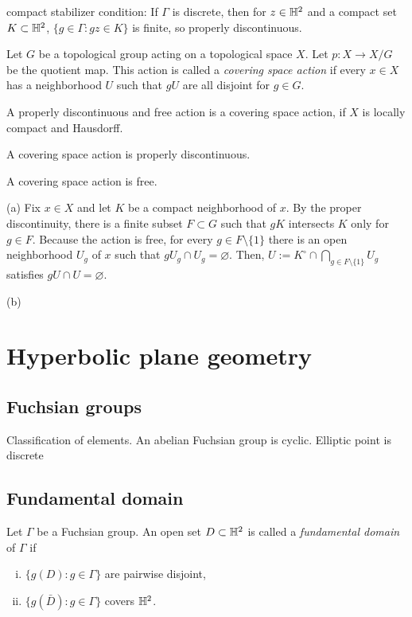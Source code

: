 \documentclass[a4paper]{article}
\begin{document}
compact stabilizer condition:
If $\Gamma$ is discrete, then for $z\in\mathbb{H}^2$ and a compact set $K\subset\mathbb{H}^2$, $\{g\in\Gamma:gz\in K\}$ is finite, so properly discontinuous.




\begin{prb}
Let $G$ be a topological group acting on a topological space $X$.
Let $p:X\to X/G$ be the quotient map.
This action is called a \emph{covering space action} if every $x\in X$ has a neighborhood $U$ such that $gU$ are all disjoint for $g\in G$.
\begin{parts}
\item A properly discontinuous and free action is a covering space action, if $X$ is locally compact and Hausdorff.
\item A covering space action is properly discontinuous.
\item A covering space action is free.
\end{parts}
\end{prb}
\begin{pf}
(a)
Fix $x\in X$ and let $K$ be a compact neighborhood of $x$.
By the proper discontinuity, there is a finite subset $F\subset G$ such that $gK$ intersects $K$ only for $g\in F$.
Because the action is free, for every $g\in F\setminus\{1\}$ there is an open neighborhood $U_g$ of $x$ such that $gU_g\cap U_g=\varnothing$.
Then, $U:=K^\circ\cap\bigcap_{g\in F\setminus\{1\}}U_g$ satisfies $gU\cap U=\varnothing$.

(b)

\end{pf}



\section{Hyperbolic plane geometry}
\subsection{Fuchsian groups}
Classification of elements.
An abelian Fuchsian group is cyclic.
Elliptic point is discrete


\subsection{Fundamental domain}

\begin{prb}
Let $\Gamma$ be a Fuchsian group.
An open set $D\subset\mathbb{H}^2$ is called a \emph{fundamental domain} of $\Gamma$ if
\begin{enumerate}[(i)]
\item $\{g(D):g\in\Gamma\}$ are pairwise disjoint,
\item $\{g(\bar D):g\in\Gamma\}$ covers $\mathbb{H}^2$.
\end{enumerate}
\end{prb}
\end{document}
